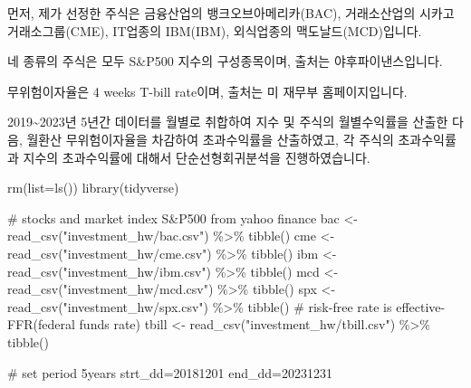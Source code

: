 \documentclass[
  a4paper,
  DIV=11,
  numbers=noendperiod]{scrreprt}
\newenvironment{Shaded}{\begin{snugshade}}{\end{snugshade}}
\newcommand{\AttributeTok}[1]{\textcolor[rgb]{0.40,0.45,0.13}{#1}}
\newcommand{\CommentTok}[1]{\textcolor[rgb]{0.37,0.37,0.37}{#1}}
\newcommand{\FunctionTok}[1]{\textcolor[rgb]{0.28,0.35,0.67}{#1}}
\newcommand{\NormalTok}[1]{\textcolor[rgb]{0.00,0.23,0.31}{#1}}
\newcommand{\OtherTok}[1]{\textcolor[rgb]{0.00,0.23,0.31}{#1}}
\newcommand{\SpecialCharTok}[1]{\textcolor[rgb]{0.37,0.37,0.37}{#1}}
\newcommand{\StringTok}[1]{\textcolor[rgb]{0.13,0.47,0.30}{#1}}
\begin{document}
먼저, 제가 선정한 주식은 금융산업의 뱅크오브아메리카(BAC), 거래소산업의
시카고거래소그룹(CME), IT업종의 IBM(IBM), 외식업종의
맥도날드(MCD)입니다.

네 종류의 주식은 모두 S\&P500 지수의 구성종목이며, 출처는
야후파이낸스입니다.

무위험이자율은 4 weeks T-bill rate이며, 출처는 미 재무부 홈페이지입니다.

2019\textasciitilde2023년 5년간 데이터를 월별로 취합하여 지수 및 주식의
월별수익률을 산출한 다음, 월환산 무위험이자율을 차감하여 초과수익률을
산출하였고, 각 주식의 초과수익률과 지수의 초과수익률에 대해서
단순선형회귀분석을 진행하였습니다.

\begin{Shaded}
\begin{Highlighting}[]
\FunctionTok{rm}\NormalTok{(}\AttributeTok{list=}\FunctionTok{ls}\NormalTok{())}
\FunctionTok{library}\NormalTok{(tidyverse)}

\CommentTok{\# stocks and market index S\&P500 from yahoo finance}
\NormalTok{bac }\OtherTok{\textless{}{-}} \FunctionTok{read\_csv}\NormalTok{(}\StringTok{"investment\_hw/bac.csv"}\NormalTok{) }\SpecialCharTok{\%\textgreater{}\%} \FunctionTok{tibble}\NormalTok{()}
\NormalTok{cme }\OtherTok{\textless{}{-}} \FunctionTok{read\_csv}\NormalTok{(}\StringTok{"investment\_hw/cme.csv"}\NormalTok{) }\SpecialCharTok{\%\textgreater{}\%} \FunctionTok{tibble}\NormalTok{()}
\NormalTok{ibm }\OtherTok{\textless{}{-}} \FunctionTok{read\_csv}\NormalTok{(}\StringTok{"investment\_hw/ibm.csv"}\NormalTok{) }\SpecialCharTok{\%\textgreater{}\%} \FunctionTok{tibble}\NormalTok{()}
\NormalTok{mcd }\OtherTok{\textless{}{-}} \FunctionTok{read\_csv}\NormalTok{(}\StringTok{"investment\_hw/mcd.csv"}\NormalTok{) }\SpecialCharTok{\%\textgreater{}\%} \FunctionTok{tibble}\NormalTok{()}
\NormalTok{spx }\OtherTok{\textless{}{-}} \FunctionTok{read\_csv}\NormalTok{(}\StringTok{"investment\_hw/spx.csv"}\NormalTok{) }\SpecialCharTok{\%\textgreater{}\%} \FunctionTok{tibble}\NormalTok{()}
\CommentTok{\# risk{-}free rate is effective{-}FFR(federal funds rate)}
\NormalTok{tbill }\OtherTok{\textless{}{-}} \FunctionTok{read\_csv}\NormalTok{(}\StringTok{"investment\_hw/tbill.csv"}\NormalTok{) }\SpecialCharTok{\%\textgreater{}\%} \FunctionTok{tibble}\NormalTok{()}

\CommentTok{\# set period 5years}
\NormalTok{strt\_dd}\OtherTok{=}\StringTok{\textquotesingle{}20181201\textquotesingle{}}
\NormalTok{end\_dd}\OtherTok{=}\StringTok{\textquotesingle{}20231231\textquotesingle{}}


\end{Highlighting}
\end{Shaded}
\end{document}
